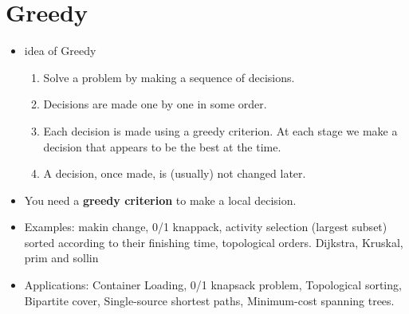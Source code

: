 \documentclass[a4paper,11pt,twoside]{book}
\begin{document}
\section{Greedy}
\begin{itemize} 

\item idea of Greedy
\begin{enumerate}
\item Solve a problem by making a sequence of decisions.

\item Decisions are made one by one in some order.

\item Each decision is made using a greedy criterion. At each stage we make a decision that appears to be the best at the time.

\item A decision, once made, is (usually) not changed later. 
\end{enumerate}


\item	You need a \textbf{greedy criterion} to make a local decision.
\item 	Examples: makin change, 0/1 knappack,  activity selection (largest subset) sorted according to their finishing time, topological orders.  Dijkstra, Kruskal, prim and sollin

\item Applications: Container Loading, 0/1 knapsack problem, Topological sorting, Bipartite cover, Single-source shortest paths, Minimum-cost spanning trees. 

\end{itemize}
\end{document}
